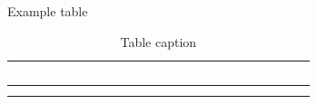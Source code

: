 \documentclass{beamer}
\begin{document}
\begin{frame}[fragile]{Example table}

{\renewcommand{\arraystretch}{1.5}
\begin{table}[htb]\small
\caption{Table caption}
\label{t1}
\begin{tabular}{|>{\centering}m{}|
>{\raggedright}m{}|m{}<{\raggedleft}|}\hline
\rowcolor{HMblue} \textcolor{white}{Text center}&  
\textcolor{white}{Text left align}&  
\textcolor{white}{Text right align}\\\hline
\rowcolor{black!20}&  &  \\\hline
\rowcolor{black!10}&  &  \\\hline
\end{tabular}
\end{table}
}
\end{frame}
\end{document}
